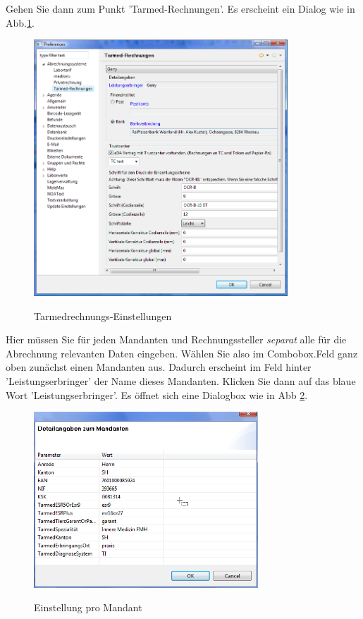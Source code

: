 \documentclass[a4paper]{scrartcl}
\begin{document}
\medskip

Gehen Sie dann zum Punkt 'Tarmed-Rechnungen'. Es erscheint ein Dialog wie in Abb.\ref{fig:abr4}.
\begin{figure}
    \center
  \includegraphics[width=0.85\textwidth]{abr4}\\
  \caption{Tarmedrechnungs-Einstellungen}\label{fig:abr4}
\end{figure}

Hier müssen Sie für jeden Mandanten und Rechnungssteller \textit{separat} alle für die Abrechnung relevanten Daten eingeben. Wählen Sie also im Combobox.Feld ganz oben zunächst einen Mandanten aus. Dadurch erscheint im Feld hinter 'Leistungserbringer' der Name dieses Mandanten. Klicken Sie dann auf das blaue Wort 'Leistungserbringer'. Es öffnet sich eine Dialogbox wie in Abb \ref{fig:abr5}.
\begin{figure}
  \center
  \includegraphics[width=0.75\textwidth]{abr5}\\
  \caption{Einstellung pro Mandant}\label{fig:abr5}
\end{figure}
\end{document}
